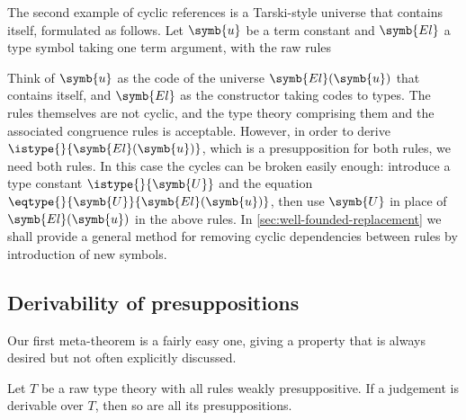 \begin{example}
  \label{ex:type-in-type}%
  The second example of cyclic references is a Tarski-style universe that contains itself, formulated as follows.
  Let $\symb{u}$ be a term constant and $\symb{El}$ a type symbol taking one term argument, with the raw rules
  \begin{mathpar}

  \end{mathpar}
  Think of $\symb{u}$ as the code of the universe $\symb{El}(\symb{u})$ that contains itself, and $\symb{El}$ as the constructor taking codes to types. The rules themselves are not cyclic,
  and the type theory comprising them and the associated congruence rules is acceptable. However, in order to derive $\istype{}{\symb{El}(\symb{u})}$, which is a presupposition for both rules, we need both rules.
  In this case the cycles can be broken easily enough: introduce a type constant $\istype{}{\symb{U}}$ and the equation $\eqtype{}{\symb{U}}{\symb{El}(\symb{u})}$, then use $\symb{U}$ in place of $\symb{El}(\symb{u})$ in the above rules.
  In \cref{sec:well-founded-replacement} we shall provide a general method for removing cyclic dependencies between rules by introduction of new symbols.
\end{example}


\subsection{Derivability of presuppositions}

Our first meta-theorem is a fairly easy one, giving a property that is always desired but not often explicitly discussed.

\begin{theorem}
  \label{thm:presuppositions}%
  Let $T$ be a raw type theory with all rules weakly presuppositive.
  If a judgement is derivable over $T$, then so are all its presuppositions.
\end{theorem}

